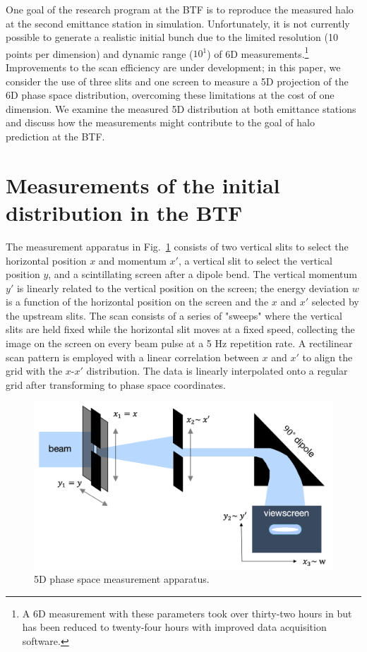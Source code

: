 \documentclass[letterpaper,
               keeplastbox,
               nospread,
               biblatex,
              ]{jacow}
\begin{document}
One goal of the research program at the BTF is to reproduce the measured halo at the second emittance station in simulation. Unfortunately, it is not currently possible to generate a realistic initial bunch due to the limited resolution (10 points per dimension) and dynamic range ($10^1$) of 6D measurements.\footnote{A 6D measurement with these parameters took over thirty-two hours in \cite{Cathey2018} but has been reduced to twenty-four hours with improved data acquisition software.} Improvements to the scan efficiency are under development; in this paper, we consider the use of three slits and one screen to measure a 5D projection of the 6D phase space distribution, overcoming these limitations at the cost of one dimension. We examine the measured 5D distribution at both emittance stations and discuss how the measurements might contribute to the goal of halo prediction at the BTF.

\section{Measurements of the initial distribution in the BTF}

The measurement apparatus in Fig.~\ref{fig:5dmeas} consists of two vertical slits to select the horizontal position $x$ and momentum $x'$, a vertical slit to select the vertical position $y$, and a scintillating screen after a dipole bend. The vertical momentum $y'$ is linearly related to the vertical position on the screen; the energy deviation $w$ is a function of the horizontal position on the screen and the $x$ and $x'$ selected by the upstream slits. The scan consists of a series of "sweeps" where the vertical slits are held fixed while the horizontal slit moves at a fixed speed, collecting the image on the screen on every beam pulse at a 5 Hz repetition rate. A rectilinear scan pattern is employed with a linear correlation between $x$ and $x'$ to align the grid with the $x$-$x'$ distribution. The data is linearly interpolated onto a regular grid after transforming to phase space coordinates.

\begin{figure}[!t]
    \centering
    \includegraphics[width=\columnwidth]{fig1.png}
    \caption{5D phase space measurement apparatus.}
    \label{fig:5dmeas}
\end{figure}
\end{document}
